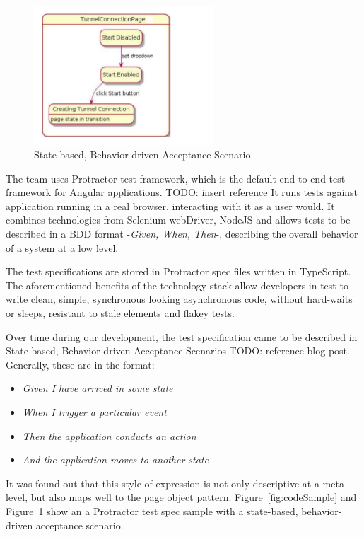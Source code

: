 \documentclass[conference]{IEEEtran}
\newcommand{\todo}[1]{}
\renewcommand{\todo}[1]{{\color{red} TODO: {#1}}}
\begin{document}
	\begin{figure}[!h]
		\includegraphics[width=0.60\textwidth,]{stateBasedScenario.pdf}
		\caption{State-based, Behavior-driven Acceptance Scenario}
		\label{fig:stateBasedScenario}
	\end{figure}

	The team uses Protractor test framework, which is the default end-to-end test framework for Angular applications. \todo{insert reference}
	It runs tests against application running in a real browser, interacting with it as a user would.
	It combines technologies from Selenium webDriver, NodeJS and allows tests to be described in a BDD format -\textit{Given, When, Then}-, describing the overall behavior of a system at a low level.
	
	The test specifications are stored in Protractor spec files written in TypeScript. 
	The aforementioned benefits of the technology stack allow developers in test to write clean, simple, synchronous looking asynchronous code, without hard-waits or sleeps, resistant to stale elements and flakey tests.

	Over time during our development, the test specification came to be described in State-based, Behavior-driven Acceptance Scenarios \todo{reference blog post}. 
	Generally, these are in the format:


	\begin{itemize}
		\item [] \textit{Given I have arrived in some state} 
		\item [] \textit{When I trigger a particular event} 
		\item [] \textit{Then the application conducts an action}
		\item [] \textit{And the application moves to another state}
	\end{itemize}

	It was found out that this style of expression is not only descriptive at a meta level, but also maps well to the page object pattern.
	Figure~\ref{fig:codeSample} and Figure~\ref{fig:stateBasedScenario} show an a Protractor test spec sample with a state-based, behavior-driven acceptance scenario.
	
\end{document}
